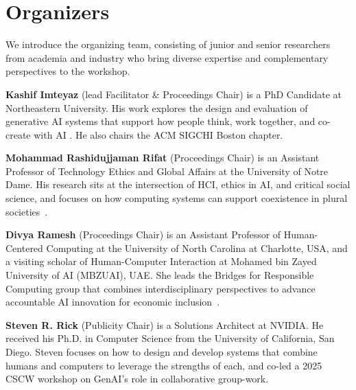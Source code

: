 \documentclass[manuscript,review]{acmart}
\begin{document}
\section{Organizers}





We introduce the organizing team, consisting of junior and senior researchers from academia and industry who bring diverse expertise and complementary perspectives to the workshop.

\textbf{Kashif Imteyaz} (lead Facilitator \& Proceedings Chair) is a PhD Candidate at Northeastern University. His work explores the design and evaluation of generative AI systems that support how people think, work together, and co-create with AI \cite{imteyaz2026co}. He also chairs the ACM SIGCHI Boston chapter.

\textbf{Mohammad Rashidujjaman Rifat} (Proceedings Chair) is an Assistant Professor of Technology Ethics and Global Affairs at the University of Notre Dame. His research sits at the intersection of HCI, ethics in AI, and critical social science, and focuses on how computing systems can support coexistence in plural societies~\cite{rifat2023many, rifat2024cohabitant, rifat2024data}.

\textbf{Divya Ramesh} (Proceedings Chair) is an Assistant Professor of Human-Centered Computing at the University of North Carolina at Charlotte, USA, and a visiting scholar of Human-Computer Interaction at Mohamed bin Zayed University of AI (MBZUAI), UAE. She leads the Bridges for Responsible Computing group that combines interdisciplinary perspectives to advance accountable AI innovation for economic inclusion~\cite{ramesh2022platform, ramesh2023ludification}. 

\textbf{Steven R. Rick} (Publicity Chair) is a Solutions Architect at NVIDIA. He received his Ph.D. in Computer Science from the University of California, San Diego. Steven focuses on how to design and develop systems that combine humans and computers to leverage the strengths of each, and co-led a 2025 CSCW workshop on GenAI's role in collaborative group-work\cite{johnson2025augmenting}.
\end{document}
